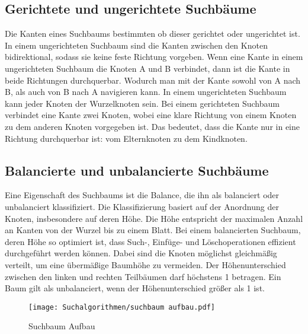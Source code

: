 \subsection{Gerichtete und ungerichtete Suchbäume} \label{gerichtete Graphen}
\label{chap:gerichtet und ungerichtete suchbäume}

Die Kanten eines Suchbaums bestimmten ob dieser gerichtet oder ungerichtet ist. In einem ungerichteten Suchbaum sind die Kanten zwischen den Knoten bidirektional, sodass sie keine feste Richtung vorgeben. Wenn eine Kante in einem ungerichteten Suchbaum die Knoten A und B verbindet, dann ist die Kante in beide Richtungen durchquerbar. Wodurch man mit der Kante sowohl von A nach B, als auch von B nach A navigieren kann. In einem ungerichteten Suchbaum kann jeder Knoten der Wurzelknoten sein. Bei einem gerichteten Suchbaum verbindet eine Kante zwei Knoten, wobei eine klare Richtung von einem Knoten zu dem anderen Knoten vorgegeben ist. Das bedeutet, dass die Kante nur in eine Richtung durchquerbar ist: vom Elternknoten zu dem Kindknoten.

\subsection{Balancierte und unbalancierte Suchbäume}
\label{chap:balancierte und unbalancierte suchbäume}

Eine Eigenschaft des Suchbaums ist die Balance, die ihn als balanciert oder unbalanciert klassifiziert. Die Klassifizierung basiert auf der Anordnung der Knoten, insbesondere auf deren Höhe. Die Höhe entspricht der maximalen Anzahl an Kanten von der Wurzel bis zu einem Blatt. Bei einem balancierten Suchbaum, deren Höhe so optimiert ist, dass Such-, Einfüge- und Löschoperationen effizient durchgeführt werden können. Dabei sind die Knoten möglichst gleichmäßig verteilt, um eine übermäßige Baumhöhe zu vermeiden. Der Höhenunterschied zwischen den linken und rechten Teilbäumen darf höchstens 1 betragen. Ein Baum gilt als unbalanciert, wenn der Höhenunterschied größer als 1 ist.

\begin{figure}[h]
  \centering
  \texttt{[image: Suchalgorithmen/suchbaum aufbau.pdf]}
	\captionsetup{justification=justified, format=plain}
  \caption{Suchbaum Aufbau}
  \label{Suchalgorithmen}
\end{figure}

